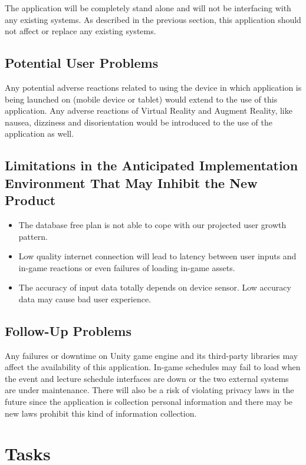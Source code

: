 \documentclass[12pt]{article}
\begin{document}
The application will be completely stand alone and will not be interfacing with any existing systems.  As described in the previous section, this application should not affect or replace any existing systems.

\subsection{Potential User Problems}

Any potential adverse reactions related to using the device in which application is being launched on (mobile device or tablet) would extend to the use of this application.  Any adverse reactions of Virtual Reality and Augment Reality, like nausea, dizziness and disorientation would be introduced to the use of the application as well.

\subsection{Limitations in the Anticipated Implementation Environment That May
Inhibit the New Product}

\begin{itemize}
\item The database free plan is not able to cope with our projected user growth pattern.
\item Low quality internet connection will lead to latency between user inputs and in-game reactions or even failures of loading in-game assets.
\item The accuracy of input data totally depends on device sensor. Low accuracy data may cause bad user experience.
\end{itemize}

\subsection{Follow-Up Problems}

Any failures or downtime on Unity game engine and its third-party libraries may affect the availability of this application. In-game schedules may fail to load when the event and lecture schedule interfaces are down or the two external systems are under maintenance. There will also be a risk of violating privacy laws in the future since the application is collection personal information and there may be new laws prohibit this kind of information collection.

\section{Tasks}
\end{document}
